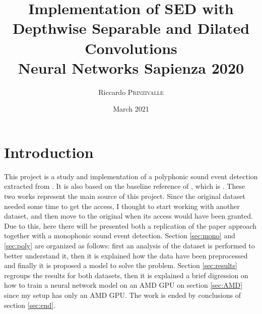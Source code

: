 \documentclass{article}
\title{Implementation of SED with Depthwise Separable and Dilated Convolutions \\[0.2em]\small{}Neural Networks Sapienza 2020} %
\author{Riccardo \textsc{Prinzivalle}} %
\date{March 2021} %
\begin{document}
\maketitle %



\section{Introduction}
\label{sec:intro}

This project is a study and implementation of a polyphonic sound event detection extracted from \cite{drossos2020sound}. It is also based on the baseline reference of \cite{drossos2020sound}, which is \cite{Cakir_2017}. These two works represent the main source of this project. Since the original dataset needed some time to get the access, I thought to start working with another dataset, and then move to the original when its access would have been granted. Due to this, here there will be presented both a replication of the paper approach together with a monophonic sound event detection.
 Section \ref{sec:mono} and \ref{sec:poly} are organized as follows: first an analysis of the dataset is performed to better understand it, then it is explained how the data have been preprocessed and finally it is proposed a model to solve the problem. Section \ref{sec:results} regroups the results for both datasets, then it is explained a brief digression on how to train a neural network model on an AMD GPU on section \ref{sec:AMD} since my setup has only an AMD GPU. The work is ended by conclusions of section \ref{sec:end}.
 
\end{document}
